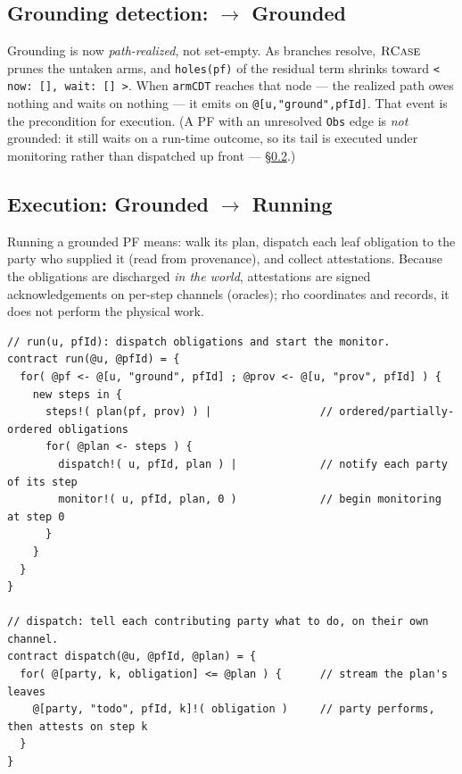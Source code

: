 \documentclass[11pt]{article}
\newcommand{\rul}[1]{\ensuremath{\textsc{#1}}}
\newcommand{\code}[1]{\lstinline[language=rho,basicstyle=\ttfamily\small]|#1|}
\begin{document}
\subsection{Grounding detection: $\to$ Grounded}
Grounding is now \emph{path-realized}, not set-empty. As branches resolve, \rul{RCase} prunes the
untaken arms, and \code{holes(pf)} of the residual term shrinks toward
\code{< now: [], wait: [] >}. When \code{armCDT} reaches that node --- the realized path owes nothing
and waits on nothing --- it emits on \code{@[u,"ground",pfId]}. That event is the precondition for
execution. (A PF with an unresolved \code{Obs} edge is \emph{not} grounded: it still waits on a
run-time outcome, so its tail is executed under monitoring rather than dispatched up front ---
\S\ref{sec:exec}.)

\subsection{Execution: Grounded $\to$ Running}\label{sec:exec}
Running a grounded PF means: walk its plan, dispatch each leaf obligation to the party who supplied it
(read from provenance), and collect attestations. Because the obligations are discharged \emph{in the
world}, attestations are signed acknowledgements on per-step channels (oracles); rho coordinates and
records, it does not perform the physical work.

\begin{lstlisting}[language=rho]
// run(u, pfId): dispatch obligations and start the monitor.
contract run(@u, @pfId) = {
  for( @pf <- @[u, "ground", pfId] ; @prov <- @[u, "prov", pfId] ) {
    new steps in {
      steps!( plan(pf, prov) ) |                 // ordered/partially-ordered obligations
      for( @plan <- steps ) {
        dispatch!( u, pfId, plan ) |             // notify each party of its step
        monitor!( u, pfId, plan, 0 )             // begin monitoring at step 0
      }
    }
  }
}

// dispatch: tell each contributing party what to do, on their own channel.
contract dispatch(@u, @pfId, @plan) = {
  for( @[party, k, obligation] <= @plan ) {      // stream the plan's leaves
    @[party, "todo", pfId, k]!( obligation )     // party performs, then attests on step k
  }
}
\end{lstlisting}
\end{document}
